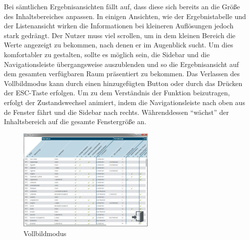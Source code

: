 Bei sämtlichen Ergebnisansichten fällt auf, dass diese sich bereits an die Größe des Inhaltsbereiches anpassen. In einigen Ansichten, wie der Ergebnistabelle und der Listenansicht wirken die Informationen bei kleineren Auflösungen jedoch stark gedrängt. Der Nutzer muss viel scrollen, um in dem kleinen Bereich die Werte angezeigt zu bekommen, nach denen er im Augenblick sucht. Um dies komfortabler zu gestalten, sollte es möglich sein, die Sidebar und die Navigationsleiste übergangsweise auszublenden und so die Ergebnisansicht auf dem gesamten verfügbaren Raum präsentiert zu bekommen. Das Verlassen des Vollbildmodus kann durch einen hinzugefügten Button oder durch das Drücken der ESC-Taste erfolgen. Um zu dem Verständnis der Funktion beizutragen, erfolgt der Zustandswechsel animiert, indem die Navigationsleiste nach oben aus de Fenster fährt und die Sidebar nach rechts. Währenddessen \enquote{wächst} der Inhaltsbereich auf die gesamte Fenstergröße an.\par
\begin{figure}[H]
 \centering
 \includegraphics[width=0.6\textwidth]{grafiken/fullscreen.png}
 \caption{Vollbildmodus}
 \label{fig:fullscreenMode}
\end{figure}
